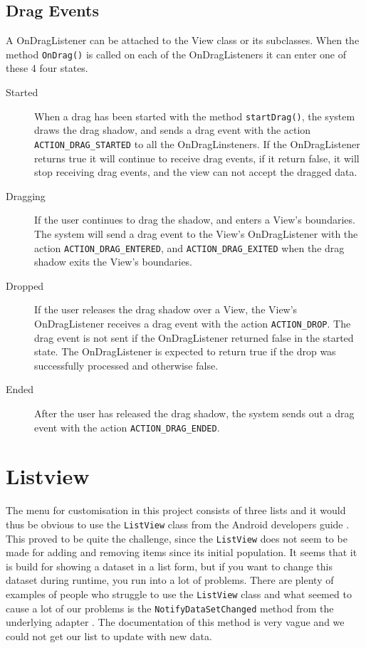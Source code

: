 \subsection*{Drag Events}
A OnDragListener can be attached to the View class or its subclasses. When the method \lstinline|OnDrag()| is called on each of the OnDragListeners it can enter one of these 4 four states.
\begin{description}
\item[Started] When a drag has been started with the method \lstinline|startDrag()|, the system draws the drag shadow, and sends a drag event with the action \lstinline|ACTION_DRAG_STARTED| to all the OnDragLinsteners. If the OnDragListener returns true it will continue to receive drag events, if it return false, it will stop receiving drag events, and the view can not accept the dragged data.

\item[Dragging] If the user continues to drag the shadow, and enters a View's boundaries. The system will send a drag event to the View's OnDragListener with the action \lstinline|ACTION_DRAG_ENTERED|, and \lstinline|ACTION_DRAG_EXITED| when the drag shadow exits the View's boundaries. 

\item[Dropped] If the user releases the drag shadow over a View, the View's OnDragListener receives a drag event with the action \lstinline|ACTION_DROP|. The drag event is not sent if the OnDragListener returned false in the started state. The OnDragListener is expected to return true if the drop was successfully processed and otherwise false.

\item[Ended] After the user has released the drag shadow, the system sends out a drag event with the action \lstinline|ACTION_DRAG_ENDED|.

\end{description}

\section{Listview}
The menu for customisation in this project consists of three lists and it would thus be obvious to use the \lstinline|ListView| class from the Android developers guide \citep{androidlayouts}. This proved to be quite the challenge, since the \lstinline|ListView| does not seem to be made for adding and removing items since its initial population. It seems that it is build for showing a dataset in a list form, but if you want to change this dataset during runtime, you run into a lot of problems. There are plenty of examples of people who struggle to use the \lstinline|ListView| class and what seemed to cause a lot of our problems is the \lstinline|NotifyDataSetChanged| method from the underlying adapter \citep{listviewfail,notifydatasetchanged}. The documentation of this method is very vague and we could not get our list to update with new data.

